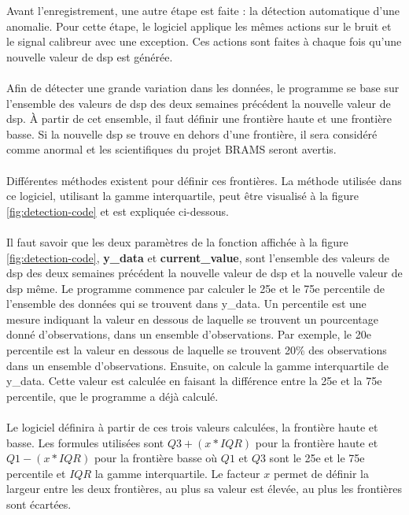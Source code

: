 \documentclass[11pt]{article}
\begin{document}
Avant l'enregistrement, une autre étape est faite : la détection automatique d'une anomalie.
Pour cette étape, le logiciel applique les mêmes actions sur le bruit et le signal calibreur avec une exception.
Ces actions sont faites à chaque fois qu'une nouvelle valeur de dsp est générée.\\
\\
Afin de détecter une grande variation dans les données, le programme se base sur l'ensemble des valeurs de dsp des deux semaines précédent la nouvelle valeur de dsp.
À partir de cet ensemble, il faut définir une frontière haute et une frontière basse.
Si la nouvelle dsp se trouve en dehors d'une frontière, il sera considéré comme anormal et les scientifiques du projet BRAMS seront avertis.\\
\\
Différentes méthodes existent pour définir ces frontières.
La méthode utilisée dans ce logiciel, utilisant la gamme interquartile, peut être visualisé à la figure \ref{fig:detection-code} et est expliquée ci-dessous.\\
\\
Il faut savoir que les deux paramètres de la fonction affichée à la figure \ref{fig:detection-code}, \textbf{y\_data} et \textbf{current\_value}, sont l'ensemble des valeurs de dsp des deux semaines précédent la nouvelle valeur de dsp et la nouvelle valeur de dsp même.
Le programme commence par calculer le 25e et le 75e percentile de l'ensemble des données qui se trouvent dans y\_data.
Un percentile est une mesure indiquant la valeur en dessous de laquelle se trouvent un pourcentage donné d'observations, dans un ensemble d'observations.
Par exemple, le 20e percentile est la valeur en dessous de laquelle se trouvent 20\% des observations dans un ensemble d'observations.
Ensuite, on calcule la gamme interquartile de y\_data.
Cette valeur est calculée en faisant la différence entre la 25e et la 75e percentile, que le programme a déjà calculé.\\
\\
Le logiciel définira à partir de ces trois valeurs calculées, la frontière haute et basse.
Les formules utilisées sont \(Q3 + (x * IQR)\) pour la frontière haute et \(Q1 - (x * IQR)\) pour la frontière basse où \(Q1\) et \(Q3\) sont le 25e et le 75e percentile et \(IQR\) la gamme interquartile.
Le facteur \(x\) permet de définir la largeur entre les deux frontières, au plus sa valeur est élevée, au plus les frontières sont écartées.\\
\\
\end{document}
